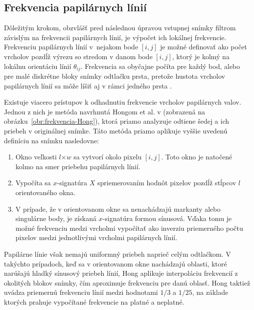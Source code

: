   \subsection{Frekvencia papilárnych línií} \label{sec:frekvencia}
  Dôležitým krokom, obzvlášť pred následnou úpravou vstupnej snímky filtrom závislým na frekvencii papilárnych línií, je výpočet ich lokálnej frekvencie.
  Frekvenciu papilárnych línií v~nejakom bode $[i,j]$ je možné definovať ako počet vrcholov pozdĺž výrezu so stredom v danom bode $[i,j]$,
  ktorý je kolmý na lokálnu orientáciu línií $\theta_{ij}$. Frekvencia sa obyčajne počíta pre každý bod, alebo pre malé diskrétne bloky snímky odtlačku prsta,
  pretože hustota vrcholov papilárnych línií sa môže líšiť aj v rámci jedného prsta \cite{Handbook}.

  Existuje viacero prístupov k odhadnutiu frekvencie vrcholov papilárnych valov. Jednou z nich je metóda navrhnutá Hongom et al. v \cite{Hong} (zobrazená na
  obrázku~{\ref{obr:frekvencia-Hong}}),
  ktorá priamo analyzuje odtiene šedej a ich priebeh v originálnej snímke. Táto metóda priamo aplikuje vyššie uvedenú definíciu na snímku nasledovne:

  \begin{enumerate}
    \item Okno veľkosti $l$$\times{}$$w$ sa vytvorí okolo pixelu $[i,j]$. Toto okno je natočené kolmo na smer priebehu papilárnych línií.
    \item Vypočíta sa $x$-signatúra $X$ spriemerovaním hodnôt pixelov pozdĺž stĺpcov $l$ orientovaného okna.
    \item V prípade, že v orientovanom okne sa nenachádzajú markanty alebo singulárne body, je získaná $x$-signatúra formou sínusová. Vďaka tomu je
          možné frekvenciu medzi vrcholmi vypočítať ako inverziu priemerného počtu pixelov medzi jednotlivými vrcholmi papilárnych línií.
  \end{enumerate}
  Papilárne línie však nemajú uniformný priebeh naprieč celým odtlačkom. V takýchto prípadoch, keď sa v orientovanom okne nachádzajú oblasti, ktoré narúšajú
  hladký sínusový priebeh línií, Hong aplikuje interpoláciu frekvencií z okolitých blokov snímky, čím aproximuje frekvenciu pre danú oblasť. Hong taktiež uvádza
  priemernú frekvenciu línií medzi hodnotami $1/3$ a $1/25$, na základe ktorých prahuje vypočítané frekvencie na platné a neplatné.

